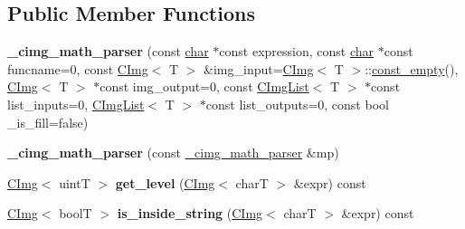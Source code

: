 \subsection*{Public Member Functions}
\begin{DoxyCompactItemize}
\item 
\mbox{\label{structcimg__library__suffixed_1_1CImg_1_1__cimg__math__parser_a591684f81af8ba85885b7de9c0c6ca5f}} 
{\bfseries \+\_\+cimg\+\_\+math\+\_\+parser} (const \hyperlink{classchar}{char} $\ast$const expression, const \hyperlink{classchar}{char} $\ast$const funcname=0, const \hyperlink{structcimg__library__suffixed_1_1CImg}{C\+Img}$<$ T $>$ \&img\+\_\+input=\hyperlink{structcimg__library__suffixed_1_1CImg}{C\+Img}$<$ T $>$\+::\hyperlink{structcimg__library__suffixed_1_1CImg_a0c25588da200d84fb03afb1b491c6738}{const\+\_\+empty}(), \hyperlink{structcimg__library__suffixed_1_1CImg}{C\+Img}$<$ T $>$ $\ast$const img\+\_\+output=0, const \hyperlink{structcimg__library__suffixed_1_1CImgList}{C\+Img\+List}$<$ T $>$ $\ast$const list\+\_\+inputs=0, \hyperlink{structcimg__library__suffixed_1_1CImgList}{C\+Img\+List}$<$ T $>$ $\ast$const list\+\_\+outputs=0, const bool \+\_\+is\+\_\+fill=false)
\item 
\mbox{\label{structcimg__library__suffixed_1_1CImg_1_1__cimg__math__parser_acdbfbefd542dbfd59b359aaf512237e2}} 
{\bfseries \+\_\+cimg\+\_\+math\+\_\+parser} (const \hyperlink{structcimg__library__suffixed_1_1CImg_1_1__cimg__math__parser}{\+\_\+cimg\+\_\+math\+\_\+parser} \&mp)
\item 
\mbox{\label{structcimg__library__suffixed_1_1CImg_1_1__cimg__math__parser_aa74c7ba8d348cc412a488c81befae866}} 
\hyperlink{structcimg__library__suffixed_1_1CImg}{C\+Img}$<$ uintT $>$ {\bfseries get\+\_\+level} (\hyperlink{structcimg__library__suffixed_1_1CImg}{C\+Img}$<$ charT $>$ \&expr) const
\item 
\mbox{\label{structcimg__library__suffixed_1_1CImg_1_1__cimg__math__parser_a138958a926b4606ab6480be21ed97592}} 
\hyperlink{structcimg__library__suffixed_1_1CImg}{C\+Img}$<$ boolT $>$ {\bfseries is\+\_\+inside\+\_\+string} (\hyperlink{structcimg__library__suffixed_1_1CImg}{C\+Img}$<$ charT $>$ \&expr) const

\end{DoxyCompactItemize}
